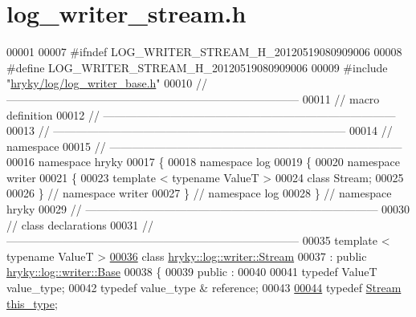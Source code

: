 \hypertarget{log__writer__stream_8h_source}{\section{log\-\_\-writer\-\_\-stream.\-h}
}

\begin{DoxyCode}
00001 
00007 \textcolor{preprocessor}{#ifndef LOG\_WRITER\_STREAM\_H\_20120519080909006}
00008 \textcolor{preprocessor}{}\textcolor{preprocessor}{#define LOG\_WRITER\_STREAM\_H\_20120519080909006}
00009 \textcolor{preprocessor}{}\textcolor{preprocessor}{#include "\hyperlink{log__writer__base_8h}{hryky/log/log_writer_base.h}"}
00010 \textcolor{comment}{//
      ------------------------------------------------------------------------------}
00011 \textcolor{comment}{// macro definition}
00012 \textcolor{comment}{//
      ------------------------------------------------------------------------------}
00013 \textcolor{comment}{//
      ------------------------------------------------------------------------------}
00014 \textcolor{comment}{// namespace}
00015 \textcolor{comment}{//
      ------------------------------------------------------------------------------}
00016 \textcolor{keyword}{namespace }hryky
00017 \{
00018 \textcolor{keyword}{namespace }log
00019 \{
00020 \textcolor{keyword}{namespace }writer
00021 \{
00023     \textcolor{keyword}{template} < \textcolor{keyword}{typename} ValueT >
00024     \textcolor{keyword}{class }Stream;
00025 
00026 \} \textcolor{comment}{// namespace writer}
00027 \} \textcolor{comment}{// namespace log}
00028 \} \textcolor{comment}{// namespace hryky}
00029 \textcolor{comment}{//
      ------------------------------------------------------------------------------}
00030 \textcolor{comment}{// class declarations}
00031 \textcolor{comment}{//
      ------------------------------------------------------------------------------}
00035 \textcolor{comment}{}\textcolor{keyword}{template} < \textcolor{keyword}{typename} ValueT >
\hypertarget{log__writer__stream_8h_source_l00036}{}\hyperlink{classhryky_1_1log_1_1writer_1_1_stream}{00036} \textcolor{keyword}{class }\hyperlink{classhryky_1_1log_1_1writer_1_1_stream}{hryky::log::writer::Stream}
00037     : \textcolor{keyword}{public} \hyperlink{classhryky_1_1log_1_1writer_1_1_base}{hryky::log::writer::Base}
00038 \{
00039 \textcolor{keyword}{public} :
00040 
00041     \textcolor{keyword}{typedef} ValueT          value\_type;
00042     \textcolor{keyword}{typedef} value\_type &    reference;
00043 
\hypertarget{log__writer__stream_8h_source_l00044}{}\hyperlink{classhryky_1_1log_1_1writer_1_1_stream_aa2852cc56ab59fe06b1a61cdf384e402}{00044}     \textcolor{keyword}{typedef} \hyperlink{classhryky_1_1log_1_1writer_1_1_stream}{Stream} \hyperlink{classhryky_1_1log_1_1writer_1_1_stream_aa2852cc56ab59fe06b1a61cdf384e402}{this_type};

\end{DoxyCode}
